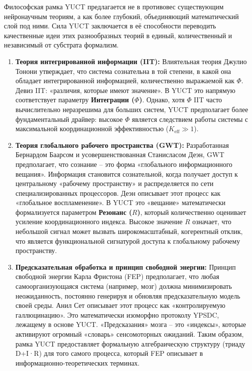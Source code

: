 \documentclass[12pt,a4paper]{article}
\begin{document}
	Философская рамка YUCT предлагается не в противовес существующим нейронаучным теориям, а как более глубокий, объединяющий математический слой под ними. Сила YUCT заключается в её способности переводить качественные идеи этих разнообразных теорий в единый, количественный и независимый от субстрата формализм.
	
	\begin{enumerate}
		\item \textbf{Теория интегрированной информации (IIT):} Влиятельная теория Джулио Тонони утверждает, что система сознательна в той степени, в какой она обладает интегрированной информацией, количественно выражаемой как \(\Phi\). Девиз IIT: «различия, которые имеют значение». В YUCT это напрямую соответствует параметру \textbf{Интеграции (\(\Phi\))}. Однако, хотя \(\Phi\) IIT часто вычислительно неразрешима для больших систем, YUCT предполагает более фундаментальный драйвер: высокое \(\Phi\) является следствием работы системы с максимальной координационной эффективностью (\(K_{\mathrm{eff}} \gg 1\)).
		
		\item \textbf{Теория глобального рабочего пространства (GWT):} Разработанная Бернардом Баарсом и усовершенствованная Станисласом Деэн, GWT предполагает, что сознание – это форма «глобального информационного вещания». Информация становится сознательной, когда получает доступ к центральному «рабочему пространству» и распределяется по сети специализированных процессоров. Деэн описывает этот процесс как «глобальное воспламенение». В YUCT это «вещание» математически формализуется параметром \textbf{Резонанс (\(R\))}, который количественно оценивает усиление координационного индекса. Высокое значение \(R\) означает, что небольшой сигнал может вызвать широкомасштабный, когерентный отклик, что является функциональной сигнатурой доступа к глобальному рабочему пространству.
		
		\item \textbf{Предсказательная обработка и принцип свободной энергии:} Принцип свободной энергии Карла Фристона (FEP) предполагает, что любая самоорганизующаяся система (например, мозг) должна минимизировать неожиданность, постоянно генерируя и обновляя предсказательную модель своей среды. Анил Сет описывает этот процесс как «контролируемую галлюцинацию». Это математически изоморфно протоколу YPSDC, лежащему в основе YUCT. «Предсказания» мозга – это «индексы», которые активируют огромный «словарь» сенсомоторных ожиданий. Таким образом, рамка YUCT предоставляет формальную алгебраическую структуру (триаду D+I·R) для того самого процесса, который FEP описывает в информационно-теоретических терминах.
		

\end{enumerate}
\end{document}
